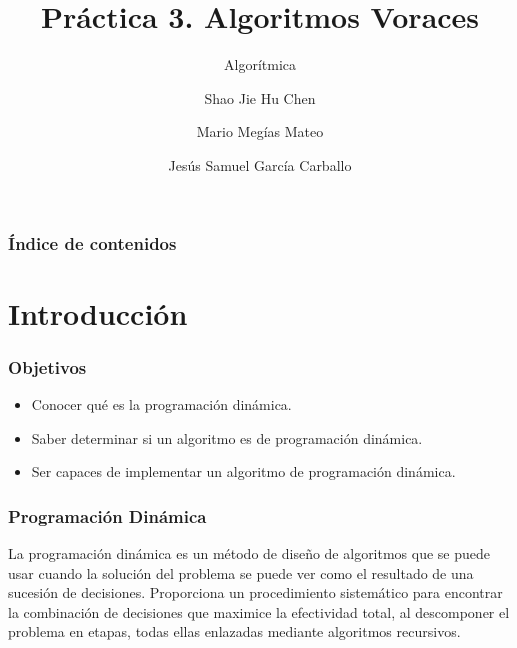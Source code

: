\documentclass[13pt]{beamer}
\author{Shao Jie Hu Chen \and Mario Megías Mateo \and Jesús Samuel García Carballo}
\title{Práctica 3. Algoritmos Voraces}
\subtitle{Algorítmica}
\institute{Equipo Rojo}
\begin{document}
	
	\begin{frame}[plain]
		\maketitle
	\end{frame}
	
	\begin{frame}
		\frametitle{Índice de contenidos}
		\tableofcontents
	\end{frame}


    \section{Introducción}

	\begin{frame}
		\frametitle{Objetivos}
        \begin{itemize}
            \item Conocer qué es la programación dinámica.
            \item Saber determinar si un algoritmo es de programación dinámica.
            \item Ser capaces de implementar un algoritmo de programación dinámica.
        \end{itemize}
	\end{frame}

	\begin{frame}
		\frametitle{Programación Dinámica}
        La programación dinámica es un método de diseño de algoritmos que se puede usar cuando la solución del 
        problema se puede ver como el resultado de una sucesión de decisiones. 
        Proporciona un procedimiento sistemático para encontrar la combinación de decisiones que maximice la efectividad
        total, al descomponer el problema en etapas, todas ellas enlazadas mediante algoritmos recursivos.
	\end{frame}
\end{document}
